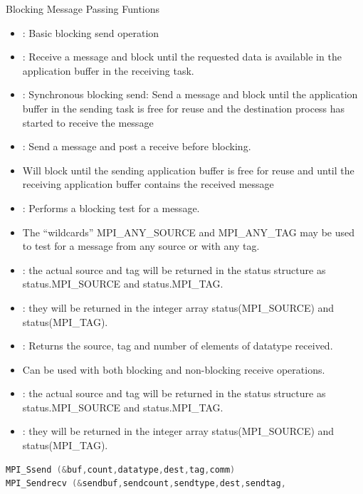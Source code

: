 \documentclass[9pt,c]{beamer}
\begin{document}
\begin{frame}{Blocking Message Passing Funtions}
  \begin{itemize}
    \item {}: Basic blocking send operation
    \item {}: Receive a message and block until the requested data is available in the application buffer in the receiving task.
    \item {}: Synchronous blocking send: Send a message and block until the application buffer in the sending task is free for reuse and the destination process has started to receive the message
    \item {}: Send a message and post a receive before blocking. 
    \item[] Will block until the sending application buffer is free for reuse and until the receiving application buffer contains the received message
    \framebreak
    \item {}: Performs a blocking test for a message. 
    \item[] The “wildcards” MPI\_ANY\_SOURCE and MPI\_ANY\_TAG may be used to test for a message from any source or with any tag. 
    \item[] : the actual source and tag will be returned in the status structure as status.MPI\_SOURCE and status.MPI\_TAG. 
    \item[] : they will be returned in the integer array status(MPI\_SOURCE) and status(MPI\_TAG).
    \item {}: Returns the source, tag and number of elements of datatype received. 
    \item[] Can be used with both blocking and non-blocking receive operations. 
    \item[] : the actual source and tag will be returned in the status structure as status.MPI\_SOURCE and status.MPI\_TAG. 
    \item[] : they will be returned in the integer array status(MPI\_SOURCE) and status(MPI\_TAG).
  \end{itemize}
  \framebreak
  \vspace{-0.5cm}
  \begin{block}{}
  \begin{lstlisting}[basicstyle=\scriptsize\ttfamily,language=C]
MPI_Ssend (&buf,count,datatype,dest,tag,comm)
MPI_Sendrecv (&sendbuf,sendcount,sendtype,dest,sendtag,

\end{lstlisting}
\end{block}
\end{frame}
\end{document}
